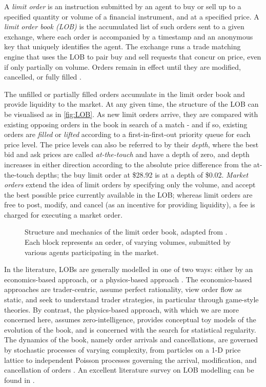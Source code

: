 A \emph{limit order} is an instruction submitted by an agent to buy or sell up to a specified quantity or volume of a financial instrument, and at a specified price. A \emph{limit order book (LOB)} is the accumulated list of such orders sent to a given exchange, where each order is accompanied by a timestamp and an anonymous key that uniquely identifies the agent. The exchange runs a trade matching engine that uses the LOB to pair buy and sell requests that concur on price, even if only partially on volume. Orders remain in effect until they are modified, cancelled, or fully filled \citep{Kyle1989}.

The unfilled or partially filled orders accumulate in the limit order book and provide liquidity to the market. At any given time, the structure of the LOB can be visualised as in \autoref{fig:LOB}. As new limit orders arrive, they are compared with existing opposing orders in the book in search of a match - and if so, existing orders are \emph{filled} or \emph{lifted} according to a first-in-first-out priority queue for each price level. The price levels can also be referred to by their \emph{depth}, where the best bid and ask prices are called \emph{at-the-touch} and have a depth of zero, and depth increases in either direction according to the absolute price difference from the at-the-touch depths; the buy limit order at \$28.92 is at a depth of \$0.02. \emph{Market orders} extend the idea of limit orders by specifying only the volume, and accept the best possible price currently available in the LOB; whereas limit orders are free to post, modify, and cancel (as an incentive for providing liquidity), a fee is charged for executing a market order.

\begin{figure}
  
\caption[Structure and mechanics of the limit order book]{Structure and mechanics of the limit order book, adapted from \citet{Booth15}. Each block represents an order, of varying volumes, submitted by various agents participating in the market.}
\label{fig:LOB}
\end{figure}

In the literature, LOBs are generally modelled in one of two ways: either by an economics-based approach, or a physics-based approach \citep{Summary2013}. The economics-based approaches are trader-centric, assume perfect rationality, view order flow as static, and seek to understand trader strategies, in particular through game-style theories. By contrast, the physics-based approach, with which we are more concerned here, assumes zero-intelligence, provides conceptual toy models of the evolution of the book, and is concerned with the search for statistical regularity. The dynamics of the book, namely order arrivals and cancellations, are governed by stochastic processes of varying complexity, from particles on a 1-D price lattice \citep{Bak97} to independent Poisson processes governing the arrival, modification, and cancellation of orders \citep{Cont10}. An excellent literature survey on LOB modelling can be found in \citet{Summary2013}.

